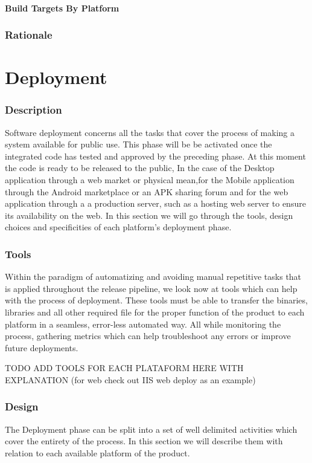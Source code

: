 \documentclass[12pt]{report}
\begin{document}
\subsection{Build Targets By Platform}
\label{s:build-targets}
\section{Rationale}
\part{Deployment}
\section{Description}
Software deployment concerns all the tasks that cover the process of making a system available for public use.
This phase will be be activated once the integrated code has tested and approved by the preceding phase. At this moment the code is ready to be released to the public, In the case of the Desktop application through a web market or physical mean,for the Mobile application through the Android marketplace or an APK sharing forum and for the web application through a a production server, such as a hosting web server to ensure its availability on the web. In this section we will go through the tools, design choices and specificities of each platform's deployment phase.

\section{Tools}
Within the paradigm of automatizing and avoiding manual repetitive tasks that is applied throughout the release pipeline, we look now at tools which can help with the process of deployment. These tools must be able to transfer the binaries, libraries and all other required file for the proper function of the product to each platform in a seamless, error-less automated way. All while monitoring the process, gathering metrics which can help troubleshoot any errors or improve future deployments.

TODO ADD TOOLS FOR EACH PLATAFORM HERE WITH EXPLANATION (for web check out IIS web deploy as an example)

\section{Design}
The Deployment phase can be split into a set of well delimited activities which cover the entirety of the process. In this section we will describe them with relation to each available platform of the product.
\end{document}

